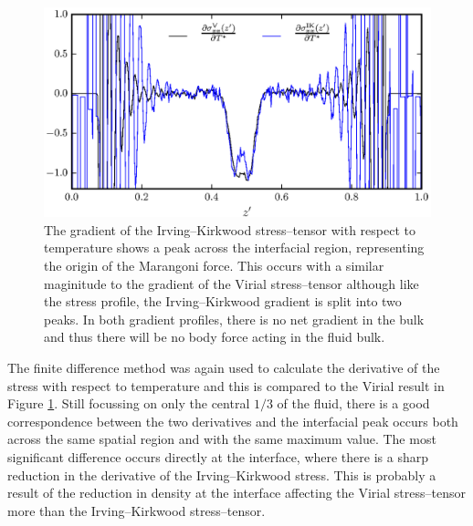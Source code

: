 \begin{figure}[h]
\centering
\includegraphics[scale=0.8]{PisIKForce}
\caption{The gradient of the Irving--Kirkwood stress--tensor with respect to temperature shows a peak across the interfacial region, representing the origin of the Marangoni force. This occurs with a similar maginitude to the gradient of the Virial stress--tensor although like the stress profile, the Irving--Kirkwood gradient is split into two peaks.
In both gradient profiles, there is no net gradient in the bulk and thus there will be no body force acting in the fluid bulk.}
\label{PisIKForce}
\end{figure}
The finite difference method was again used to calculate the derivative of the stress with respect to temperature and this is compared to the Virial result in Figure \ref{PisIKForce}.
Still focussing on only the central $1/3$ of the fluid, there is a good correspondence between the two derivatives and the interfacial peak occurs both across the same spatial region and with the same maximum value.
The most significant difference occurs directly at the interface, where there is a sharp reduction in the derivative of the Irving--Kirkwood stress.
This is probably a result of the reduction in density at the interface affecting the Virial stress--tensor more than the Irving--Kirkwood stress--tensor.
\FloatBarrier

